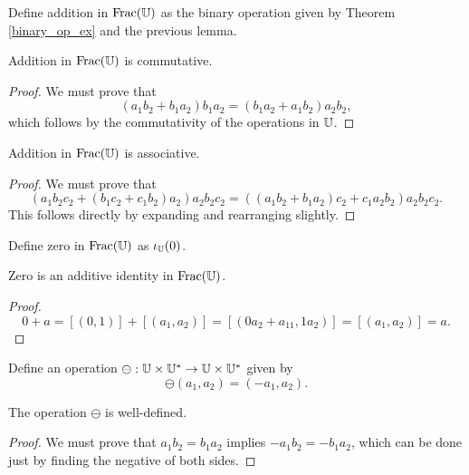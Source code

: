\documentclass[../../math.tex]{subfiles}
\begin{document}
\begin{instance}
    Define addition in $\operatorname{Frac}(\mathbb{U})$ as the binary operation given by Theorem
    \ref{binary_op_ex} and the previous lemma.
\end{instance}

\begin{instance}
    Addition in $\operatorname{Frac}(\mathbb{U})$ is commutative.
\end{instance}
\begin{proof}
    We must prove that
    \[
        (a_1b_2 + b_1a_2)b_1a_2 = (b_1a_2 + a_1b_2)a_2b_2,
    \]
    which follows by the commutativity of the operations in $\mathbb{U}$.
\end{proof}

\begin{instance}
    Addition in $\operatorname{Frac}(\mathbb{U})$ is associative.
\end{instance}
\begin{proof}
    We must prove that
    \[
        (a_1b_2c_2 + (b_1c_2 + c_1b_2)a_2)a_2b_2c_2 =
        ((a_1b_2 + b_1a_2)c_2 + c_1a_2b_2)a_2b_2c_2.
    \]
    This follows directly by expanding and rearranging slightly.
\end{proof}

\begin{instance}
    Define zero in $\operatorname{Frac}(\mathbb{U})$ as $\iota_{\mathbb{U}}(0)$.
\end{instance}

\begin{instance}
    Zero is an additive identity in $\operatorname{Frac}(\mathbb{U})$.
\end{instance}
\begin{proof}
    \[
        0 + a =
        [(0, 1)] + [(a_1, a_2)] =
        [(0a_2 + a_11, 1a_2)] =
        [(a_1, a_2)]
        = a.
    \]
\end{proof}

\begin{definition}
    Define an operation $\ominus : \mathbb{U} \times \mathbb{U}^* \to \mathbb{U} \times \mathbb{U}^*$ given by
    \[
        \ominus (a_1, a_2) = (-a_1, a_2).
    \]
\end{definition}

\begin{lemma}
    The operation $\ominus$ is well-defined.
\end{lemma}
\begin{proof}
    We must prove that $a_1b_2 = b_1a_2$ implies $-a_1b_2 = -b_1a_2$, which can
    be done just by finding the negative of both sides.
\end{proof}
\end{document}
